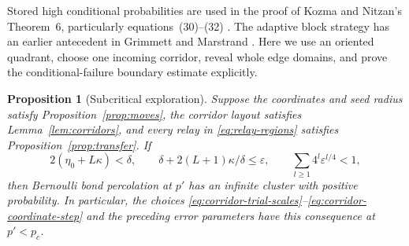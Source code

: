 \documentclass[11pt]{article}
\newtheorem{proposition}[theorem]{Proposition}
\theoremstyle{definition}
\newcommand{\pc}{p_c}
\begin{document}
Stored high conditional probabilities are used in the proof of
Kozma and Nitzan's Theorem~6, particularly equations~(30)--(32)
\cite{KozmaNitzan2024}. The adaptive block strategy has an earlier
antecedent in Grimmett and Marstrand \cite[Sections~3--4]{GrimmettMarstrand1990}.
Here we use an oriented quadrant, choose one incoming corridor,
reveal whole edge domains, and prove the conditional-failure boundary
estimate explicitly.

\begin{proposition}[Subcritical exploration]\label{prop:exploration}
Suppose the coordinates and seed radius satisfy
Proposition~\ref{prop:moves}, the corridor layout satisfies
Lemma~\ref{lem:corridors}, and every relay in
\eqref{eq:relay-regions} satisfies Proposition~\ref{prop:transfer}.
If
\[
 2(\eta_0+L\kappa)<\delta,\qquad
 \delta+2(L+1)\kappa/\delta\le\varepsilon,
 \qquad\sum_{l\ge1}4^l\varepsilon^{l/4}<1,
\]
then Bernoulli bond percolation at $p'$ has an infinite cluster with
positive probability. In particular, the choices
\eqref{eq:corridor-trial-scales}--\eqref{eq:corridor-coordinate-step}
and the preceding error parameters have this consequence at $p'<\pc$.
\end{proposition}
\end{document}
